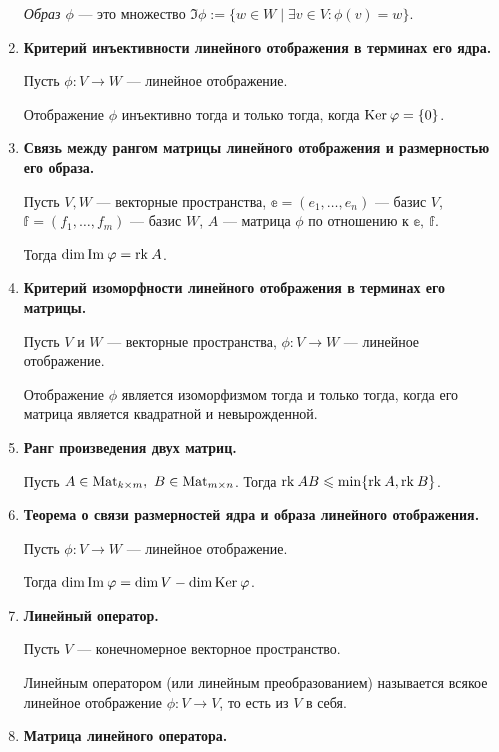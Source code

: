 \begin{enumerate}
\textit{Образ $\phi$} --- это множество $\Im \phi := \{w \in W \mid \exists v \in V : \phi(v) = w \}$.

\item \textbf{Критерий инъективности линейного отображения в терминах его ядра.}

Пусть $\phi\colon V \rightarrow W$ --- линейное отображение.

Отображение $\phi$ инъективно тогда и только тогда, когда $\mathrm{Ker}\: \varphi = \{0\}$.

\item \textbf{Связь между рангом матрицы линейного отображения и размерностью его образа.}

Пусть $V, W$ --- векторные пространства, $\mathbb{e} = (e_1, \ldots, e_n)$ --- базис $V$, $\mathbb{f} = (f_1, \ldots, f_m)$ --- базис $W$, $A$ --- матрица $\phi$ по отношению к $\mathbb{e},\ \mathbb{f}$.

Тогда $\dim \mathrm{Im\:} \varphi = \mathrm{rk}\: A$.

\item \textbf{Критерий изоморфности линейного отображения в терминах его матрицы.}

Пусть $V$ и $W$ --- векторные пространства, $\phi: V \rightarrow W$ --- линейное отображение.

Отображение $\phi$ является изоморфизмом тогда и только тогда, когда его матрица является квадратной и невырожденной.

\item \textbf{Ранг произведения двух матриц.}

Пусть $A \in \mathrm{Mat}_{k\times m},\ B\in \mathrm{Mat}_{m\times n}$. Тогда $\mathrm{rk}\: AB \leqslant \min\{\mathrm{rk}\: A, \mathrm{rk}\: B\}$.

\item \textbf{Теорема о связи размерностей ядра и образа линейного отображения.}

Пусть $\phi\colon V \rightarrow W$ --- линейное отображение.

Тогда $\dim \mathrm{Im\:} \varphi = \dim V - \dim \mathrm{Ker}\: \varphi$.

\item \textbf{Линейный оператор.}

Пусть $V$ --- конечномерное векторное пространство.

Линейным оператором (или линейным преобразованием) называется всякое линейное отображение $\phi \colon V \rightarrow V$, то есть из $V$ в себя.

\item \textbf{Матрица линейного оператора.}


\end{enumerate}
